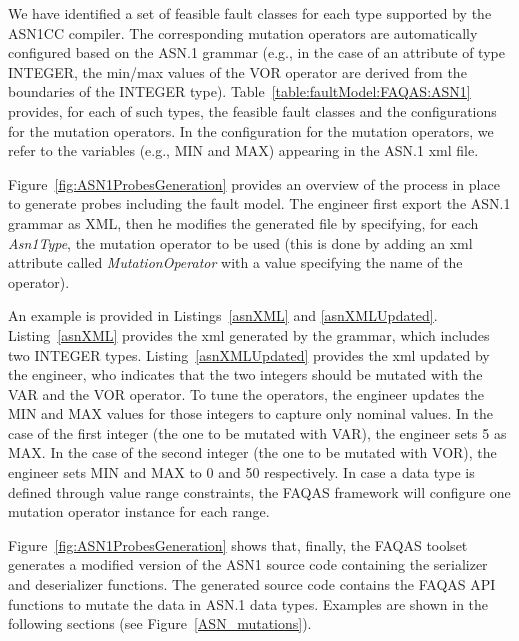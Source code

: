 We have identified a set of feasible fault classes for each type supported by the ASN1CC compiler.
The corresponding mutation operators are automatically configured based on the ASN.1 grammar (e.g., in the case of an attribute of type INTEGER, the min/max values of the VOR operator are derived from the boundaries of the INTEGER type).
Table~\ref{table:faultModel:FAQAS:ASN1} provides, for each of such types, the feasible fault classes and the configurations for the mutation operators.
In the configuration for the mutation operators, we refer to the variables (e.g., MIN and MAX) appearing in the ASN.1 xml file.

Figure~\ref{fig:ASN1ProbesGeneration} provides an overview of the process in place to generate probes including the fault model.
The engineer first export the ASN.1 grammar as XML, then he modifies the generated file by specifying, for each \emph{Asn1Type}, the mutation operator to be used (this is done by adding an xml attribute called \emph{MutationOperator} with a value specifying the name of the operator). 

An example is provided in Listings~\ref{asnXML} and \ref{asnXMLUpdated}. Listing~\ref{asnXML} provides the xml generated by the grammar, which includes two INTEGER types.
Listing~\ref{asnXMLUpdated} provides the xml updated by the engineer, who indicates that the two integers should be mutated with the VAR and the VOR operator. To tune the operators, the engineer updates the MIN and MAX values for those integers to capture only nominal values. 
In the case of the first integer (the one to be mutated with VAR), the engineer sets 5 as MAX.
In the case of the second integer (the one to be mutated with VOR), the engineer sets MIN and MAX to 0 and 50 respectively.
In case a data type is defined through value range constraints, the FAQAS framework will configure one mutation operator instance for each range.



Figure~\ref{fig:ASN1ProbesGeneration} shows that, finally, the FAQAS toolset generates a modified version of the ASN1 source code containing the serializer and deserializer functions. The generated source code contains the FAQAS API functions to mutate the data in ASN.1 data types. Examples are shown in the following sections (see Figure~\ref{ASN_mutations}).

